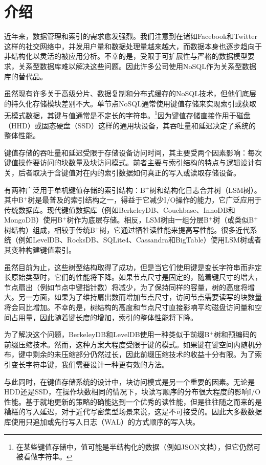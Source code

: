 \section{介绍}

近年来，数据管理和索引的需求愈发强烈。我们注意到在诸如Facebook和Twitter这样的社交网络中，并发用户量和数据处理量越来越大，而数据本身也逐步趋向于非结构化以灵活的被应用分析。不幸的是，受限于可扩展性与严格的数据模型要求，关系型数据库难以解决这些问题。因此许多公司使用NoSQL作为关系型数据库的替代品。

虽然现有许多关于高级分片、数据复制和分布式缓存的NoSQL技术，但他们底层的持久化存储模块差别不大。单节点NoSQL通常使用键值存储来实现索引或获取无模式数据，其键与值通常是不定长的字符串。\footnote{在某些键值存储中，值可能是半结构化的数据（例如JSON文档），但它仍然可被看做字符串。}因为键值存储直接作用于磁盘（HHD）或固态硬盘（SSD）这样的通用块设备，其吞吐量和延迟决定了系统的整体性能。

键值存储的吞吐量和延迟受限于存储设备访问时间，其主要受两个因素影响：每次键值操作要访问的块数量及块访问模式。前者主要与索引结构的特点与逻辑设计有关，后者取决于含键值对在内的索引数据如何真正的写入或读取存储设备。

有两种广泛用于单机键值存储的索引结构：B$^+$树和结构化日志合并树（LSM树）。其中B$^+$树是最普及的索引结构之一，得益于它减少I/O操作的能力，它广泛应用于传统数据库。现代键值数据库（例如BerkeleyDB、Couchbase、InnoDB和MongoDB）使用B$^+$树作为底层存储。相反，LSM树由一组分层B$^+$树（或类似B$^+$树结构）组成，相较于传统B$^+$树，它通过牺牲读性能来提高写性能。很多近代系统（例如LevelDB、RocksDB、SQLite4、Cassandra和BigTable）使用LSM树或者其变种构建键值索引。

虽然目前为止，这些树型结构取得了成功，但是当它们使用键是变长字符串而非定长原始类型时，它们的性能将下降。如果节点尺寸是固定的，随着键尺寸的增大，节点扇出（例如节点中键指针数）将减少，为了保持同样的容量，树的高度将增大。另一方面，如果为了维持扇出数而增加节点尺寸，访问节点需要读写的块数量将会同比增加。不幸的是，树结构的高度和节点尺寸直接影响平均磁盘访问量和空间占用量，因此随着键长度的增加，索引的整体性能将下降。

为了解决这个问题，BerkeleyDB和LevelDB使用一种类似于前缀B$^+$树和预编码的前缀压缩技术。然而，这种方案大程度受限于键的模式。如果键在键空间内随机分布，键中剩余的未压缩部分仍然过长，因此前缀压缩技术的收益十分有限。为了索引变长字符串键，我们需要设计一种更有效的方法。

与此同时，在键值存储系统的设计中，块访问模式是另一个重要的因素。无论是HDD还是SSD，在操作块数相同的情况下，块读写顺序的分布很大程度的影响I/O性能。基于就地更新的策略的确能达到一个优秀的读性能，但是往往随之而来的是糟糕的写入延迟，对于近代写密集型场景来说，这是不可接受的。因此大多数数据库使用只追加或先行写入日志（WAL）的方式顺序的写入块。

